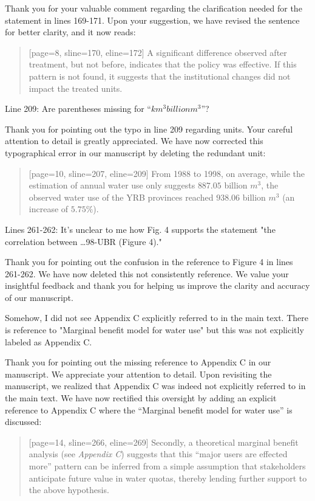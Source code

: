 \AR{} Thank you for your valuable comment regarding the clarification needed for the statement in lines 169-171. Upon your suggestion, we have revised the sentence for better clarity, and it now reads:

\begin{quote}[page=8, sline=170, eline=172]
    A significant difference observed after treatment, but not before, indicates that the policy was effective.
    If this pattern is not found, it suggests that the institutional changes did not impact the treated units.
\end{quote}

\RC{} Line 209: Are parentheses missing for ``$km^3 billion m^3$''?

\AR{} Thank you for pointing out the typo in line 209 regarding units. Your careful attention to detail is greatly appreciated. We have now corrected this typographical error in our manuscript by deleting the redundant unit:

\begin{quote}[page=10, sline=207, eline=209]
    From 1988 to 1998, on average, while the estimation of annual water use only suggests $887.05$ billion $m^3$, the observed water use of the YRB provinces reached $938.06$ billion $m^3$ (an increase of $5.75\%$).
\end{quote}

\RC{} Lines 261-262: It's unclear to me how Fig. 4 supports the statement "the correlation between \dots 98-UBR (Figure 4)."

\AR{} Thank you for pointing out the confusion in the reference to Figure 4 in lines 261-262. We have now deleted this not consistently reference. We value your insightful feedback and thank you for helping us improve the clarity and accuracy of our manuscript.

\RC{} Somehow, I did not see Appendix C explicitly referred to in the main text. There is reference to "Marginal benefit model for water use" but this was not explicitly labeled as Appendix C.

\AR{} Thank you for pointing out the missing reference to Appendix C in our manuscript. We appreciate your attention to detail. Upon revisiting the manuscript, we realized that Appendix C was indeed not explicitly referred to in the main text. We have now rectified this oversight by adding an explicit reference to Appendix C where the ``Marginal benefit model for water use'' is discussed:

\begin{quote}[page=14, sline=266, eline=269]
    Secondly, a theoretical marginal benefit analysis (see \textit{Appendix C}) suggests that this ``major users are effected more'' pattern can be inferred from a simple assumption that stakeholders anticipate future value in water quotas, thereby lending further support to the above hypothesis.
\end{quote}


